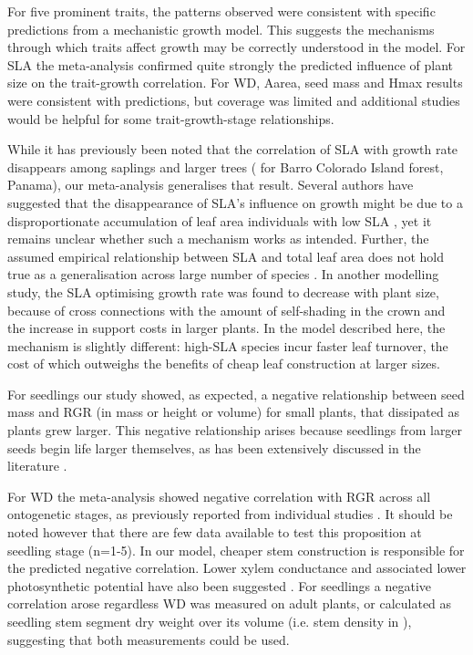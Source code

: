 \documentclass[a4paper,11pt]{article}
\begin{document}
For five prominent traits, the patterns observed were consistent with specific predictions from a mechanistic growth model. This suggests the mechanisms through which traits affect growth may be correctly understood in the model. For SLA the meta-analysis confirmed quite strongly the predicted influence of plant size on the trait-growth correlation. For WD, Aarea, seed mass and Hmax results were consistent with predictions, but coverage was limited and additional studies would be helpful for some trait-growth-stage relationships.

While it has previously been noted that the correlation of SLA with growth rate disappears among saplings and larger trees (\citealt{Wright:2010tp} for Barro Colorado Island forest, Panama), our meta-analysis generalises that result. Several authors have suggested that the disappearance of SLA's influence on growth might be due to a disproportionate accumulation of leaf area individuals with low SLA \citep{Reich:1992wm, Poorter:2008iu,Wright:2010tp}, yet it remains unclear whether such a mechanism works as intended. Further, the assumed empirical relationship between SLA and total leaf area does not hold true as a generalisation across large number of species \citep{Duursma-2015}. In another modelling study, the SLA optimising growth rate was found to decrease with plant size, because of cross connections with the amount of self-shading in the crown and the increase in support costs in larger plants. In the model described here, the mechanism is slightly different: high-SLA species incur faster leaf turnover, the cost of which outweighs the benefits of cheap leaf construction at larger sizes.

For seedlings our study showed, as expected, a negative relationship between seed mass and RGR (in mass or height or volume) for small plants, that dissipated as plants grew larger. This negative relationship arises because seedlings from larger seeds begin life larger themselves, as has been extensively discussed in the literature \citep[reviewed by][]{Turnbull:2012ew}. 

For WD the meta-analysis showed negative correlation with RGR across all ontogenetic stages, as previously reported from individual studies \citep{Wright:2010tp,Ruger:2012jv}. It should be noted however that there are few data available to test this proposition at seedling stage (n=1-5). In our model, cheaper stem construction is responsible for the predicted negative correlation. Lower xylem conductance and associated lower photosynthetic potential have also been suggested \citep[reviewed by][]{Chave:2009iy}.
For seedlings a negative correlation arose regardless WD was measured on adult plants, or calculated as seedling stem segment dry weight over its volume (i.e. stem density in  \citealt{CastroDiez:1998gz}), suggesting that both measurements could be used.
\end{document}
